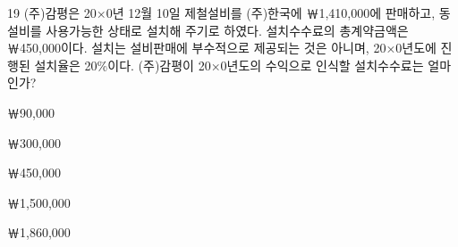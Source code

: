 \begin{question}{19}
(주)감평은 20×0년 12월 10일 제철설비를 (주)한국에 ￦1,410,000에 판매하고, 동 설비를 사용가능한 상태로 설치해 주기로 하였다. 설치수수료의 총계약금액은 ￦450,000이다. 설치는 설비판매에 부수적으로 제공되는 것은 아니며, 20×0년도에 진행된 설치율은 20\%이다. (주)감평이 20×0년도의 수익으로 인식할 설치수수료는 얼마인가?
\begin{choices}
  \item ￦90,000
  \item ￦300,000
  \item ￦450,000
  \item ￦1,500,000
  \item ￦1,860,000
\end{choices}
\end{question}
